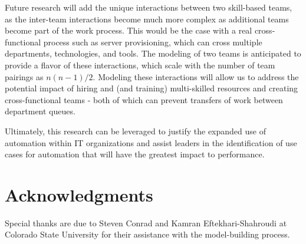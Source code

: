 \documentclass[conference]{IEEEtran}
\begin{document}
Future research will add the unique interactions between two skill-based teams, as the inter-team interactions become much more complex as additional teams become part of the work process. This would be the case with a real cross-functional process such as server provisioning, which can cross multiple departments, technologies, and tools. The modeling of two teams is anticipated to provide a flavor of these interactions, which scale with the number of team pairings as $n(n-1)/2$. Modeling these interactions will allow us to address the potential impact of hiring and (and training) multi-skilled resources and creating cross-functional teams - both of which can prevent transfers of work between department queues.

Ultimately, this research can be leveraged to justify the expanded use of automation within IT organizations and assist leaders in the identification of use cases for automation that will have the greatest impact to performance.

\section*{Acknowledgments}
Special thanks are due to Steven Conrad and Kamran Eftekhari-Shahroudi at Colorado State University for their assistance with the model-building process.




\vspace{12pt}
\end{document}

